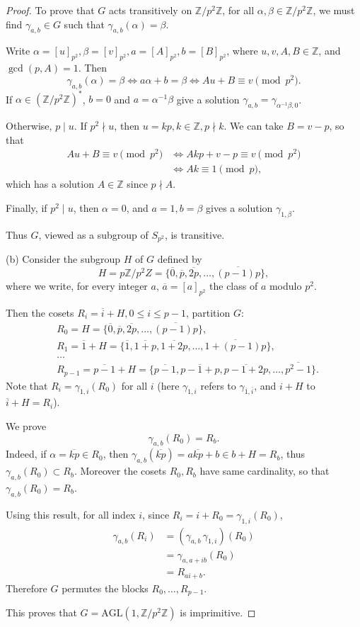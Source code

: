 \documentclass[11pt,a4paper]{article}
\newcommand{\Z}{\mathbb{Z}}
\begin{document}
\begin{proof}
To prove that $G$ acts transitively on $\Z/p^2\Z$, for all $\alpha,\beta \in \Z/p^2 \Z$, we must find $\gamma_{a,b} \in G$ such that $\gamma_{a,b}(\alpha) = \beta$.

Write $\alpha = [u]_{p^2},  \beta = [v]_{p^2}, a = [A]_{p^2}, b = [B]_{p^2}$, where $u,v,A,B \in \Z$, and $\gcd(p,A) = 1$. Then
$$\gamma_{a,b}(\alpha) = \beta \iff a\alpha + b =\beta \iff A u + B \equiv v \pmod {p^2}.$$
If $\alpha \in (\Z/p^2\Z)^*$, $b = 0$ and $a = \alpha^{-1}\beta$ give a solution $\gamma_{a,b} = \gamma_{\alpha^{-1}\beta , 0}$.

Otherwise, $p \mid u$. If $p^2 \nmid u$, then $u = kp, k\in \Z, p \nmid k$. We can take $B = v-p$, so that
 \begin{align*}
 A u + B \equiv v \pmod {p^2} &\iff Akp + v-p \equiv v \pmod {p^2}\\
 & \iff Ak \equiv 1 \pmod p,
 \end{align*}
which has a solution $A \in \Z$ since $p \nmid A$. 

Finally, if $p^2 \mid u$, then $\alpha = 0$, and $a=1, b = \beta$ gives a solution $\gamma_{1,\beta}$. 

Thus $G$, viewed as a subgroup of $S_{p^2}$, is transitive.

\item[(b)] Consider the subgroup $H$ of $G$ defined by
$$H = p\Z/p^2 Z = \{\overline{0}, \overline{p},\overline{2p},\ldots,\overline{(p-1)p}\},$$
where we write, for every integer $a$, $\overline{a} = [a]_{p^2}$ the class of $a$ modulo $p^2$.

Then the cosets $R_i = \overline{i} + H, 0 \leq i \leq p-1$, partition $G$:
\begin{align*}
&R_0 = H = \{\overline{0}, \overline{p},\overline{2p},\ldots,\overline{(p-1)p}\},\\
&R_1 = \overline{1}+H =  \{\overline{1}, \overline{1+p},\overline{1+2p},\ldots,\overline{1+(p-1)p}\},\\
&\ldots\\
&R_{p-1} = \overline{p-1}+H = \{\overline{p-1}, \overline{p-1 + p},\overline{p-1+ 2p},\ldots,\overline{p^2-1}\}.
\end{align*}
Note that $R_i = \gamma_{1,i}(R_0)$ for all $i$ (here $\gamma_{1,i}$ refers to $\gamma_{\overline1 ,\overline i}$, and $i+H$ to $\overline{i} + H = R_i$).

 We prove
$$\gamma_{a,b}(R_0) = R_b.$$
Indeed, if $\alpha = \overline{kp} \in R_0$, then $\gamma_{a,b}(\overline{kp}) = a\overline{kp} + b \in b+ H = R_b$, thus $\gamma_{a,b}(R_0) \subset R_b$. 
Moreover the cosets $R_0, R_b$ have same cardinality, so that $\gamma_{a,b}(R_0) = R_b$.

Using this result, for all index $i$, since $R_i = i + R_0 = \gamma_{1,i}(R_0)$,
\begin{align*}
\gamma_{a,b}(R_i) &= (\gamma_{a,b}\,  \gamma_{1,i})(R_0)\\
&=\gamma_{a,a+ib}(R_0)\\
&=R_{ai+b}.
\end{align*}
Therefore $G$ permutes the blocks $R_0,\ldots,R_{p-1}$. 

This proves that $G = \mathrm{AGL}(1,\Z/p^2\Z)$ is imprimitive.
\end{proof}
\end{document}
